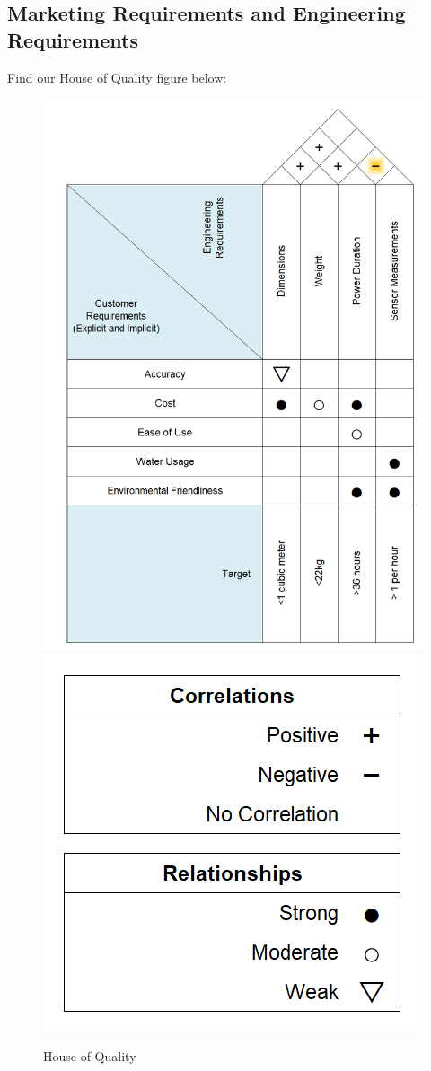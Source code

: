 \subsection{Marketing Requirements and Engineering Requirements}
Find our House of Quality figure below:
\begin{figure}[H]
    \centering
    \caption{House of Quality}
    \includegraphics[width=.45\textwidth]{images/HouseOfQuality.PNG}
    \includegraphics[width=.25\textwidth]{images/HouseOfQualityLegend.png}
\end{figure}